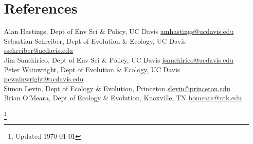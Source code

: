 \documentclass[margin]{res}
\begin{document}
\begin{resume}
\begin{position}
\end{position}


\begin{position}
\end{position}

\begin{position}
\end{position}





\section{References}

Alan Hastings, Dept of Env Sci \& Policy, UC Davis \href{mailto:amhastings@ucdavis.edu}{amhastings@ucdavis.edu} \\ 
Sebastian Schreiber, Dept of Evolution \& Ecology, UC Davis \href{mailto:sschreiber@ucdavis.edu}{sschreiber@ucdavis.edu} \\
Jim Sanchirico, Dept of Env Sci \& Policy, UC Davis \href{mailto:jsanchirico@ucdavis.edu}{jsanchirico@ucdavis.edu} \\
Peter Wainwright, Dept of Evolution \& Ecology, UC Davis \href{mailto:pcwainwright@ucdavis.edu}{pcwainwright@ucdavis.edu} \\
Simon Levin, Dept of Ecology \& Evolution, Princeton \href{mailto:slevin@princeton.edu}{slevin@princeton.edu} \\
Brian O'Meara, Dept of Ecology \& Evolution, Knoxville, TN \href{mailto:bomeara@utk.edu}{bomeara@utk.edu}

\end{resume}
\let\thefootnote\relax\footnote{Updated \today}
\end{document}

